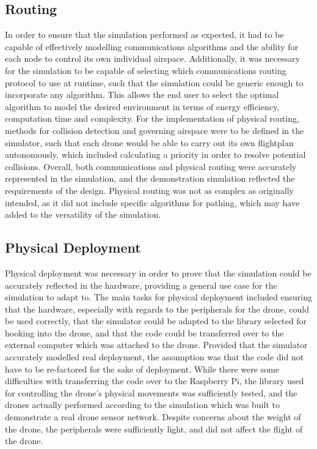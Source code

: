 		\subsection{Routing}
In order to ensure that the simulation performed as expected, it had to be capable of effectively modelling communications algorithms and the ability for each node to control its own individual airspace. Additionally, it was necessary for the simulation to be capable of selecting which communications routing protocol to use at runtime, such that the simulation could be generic enough to incorporate any algorithm. This allows the end user to select the optimal algorithm to model the desired environment in terms of energy efficiency, computation time and complexity. For the implementation of physical routing, methods for collision detection and governing airspace were to be defined in the simulator, such that each drone would be able to carry out its own flightplan autonomously, which included calculating a priority in order to resolve potential collisions. Overall, both communications and physical routing were accurately represented in the simulation, and the demonstration simulation reflected the requirements of the design. Physical routing was not as complex as originally intended, as it did not include specific algorithms for pathing, which may have added to the versatility of the simulation.
\subsection{Physical Deployment}
Physical deployment was necessary in order to prove that the simulation could be accurately reflected in the hardware, providing a general use case for the simulation to adapt to. The main tasks for physical deployment included ensuring that the hardware, especially with regards to the peripherals for the drone, could be used correctly, that the simulator could be adapted to the library selected for hooking into the drone, and that the code could be transferred over to the external computer which was attached to the drone. Provided that the simulator accurately modelled real deployment, the assumption was that the code did not have to be re-factored for the sake of deployment. While there were some difficulties with transferring the code over to the Raspberry Pi, the library used for controlling the drone’s physical movements was sufficiently tested, and the drones actually performed according to the simulation which was built to demonstrate a real drone sensor network. Despite concerns about the weight of the drone, the peripherals were sufficiently light, and did not affect the flight of the drone.
